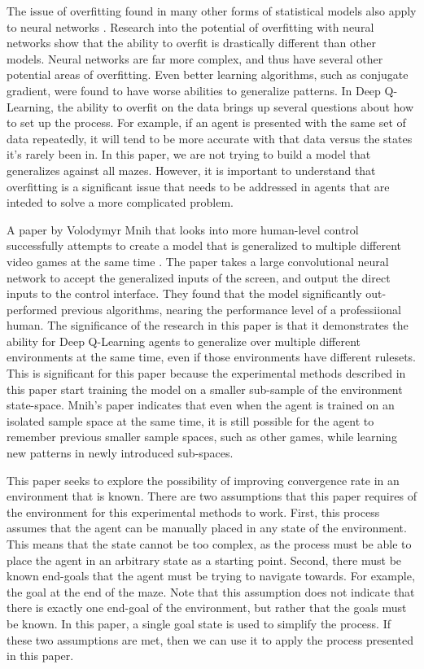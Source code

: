 \documentclass[12pt,letterpaper]{article}
\begin{document}
The issue of overfitting found in many other forms of statistical models also apply to neural networks \cite{article_overfitting_neural_networks}.
Research into the potential of overfitting with neural networks show that the ability to overfit is drastically different than other models.
Neural networks are far more complex, and thus have several other potential areas of overfitting.
Even better learning algorithms, such as conjugate gradient, were found to have worse abilities to generalize patterns.
In Deep Q-Learning, the ability to overfit on the data brings up several questions about how to set up the process.
For example, if an agent is presented with the same set of data repeatedly, it will tend to be more accurate with that data versus the states it's rarely been in.
In this paper, we are not trying to build a model that generalizes against all mazes.
However, it is important to understand that overfitting is a significant issue that needs to be addressed in agents that are inteded to solve a more complicated problem.

A paper by Volodymyr Mnih that looks into more human-level control successfully attempts to create a model that is generalized to multiple different video games at the same time \cite{article_human_level_control_deep_reinforcement_learning}.
The paper takes a large convolutional neural network to accept the generalized inputs of the screen, and output the direct inputs to the control interface.
They found that the model significantly out-performed previous algorithms, nearing the performance level of a professiional human.
The significance of the research in this paper is that it demonstrates the ability for Deep Q-Learning agents to generalize over multiple different environments at the same time, even if those environments have different rulesets.
This is significant for this paper because the experimental methods described in this paper start training the model on a smaller sub-sample of the environment state-space.
Mnih's paper indicates that even when the agent is trained on an isolated sample space at the same time, it is still possible for the agent to remember previous smaller sample spaces, such as other games, while learning new patterns in newly introduced sub-spaces.

This paper seeks to explore the possibility of improving convergence rate in an environment that is known.
There are two assumptions that this paper requires of the environment for this experimental methods to work.
First, this process assumes that the agent can be manually placed in any state of the environment.
This means that the state cannot be too complex, as the process must be able to place the agent in an arbitrary state as a starting point.
Second, there must be known end-goals that the agent must be trying to navigate towards.
For example, the goal at the end of the maze.
Note that this assumption does not indicate that there is exactly one end-goal of the environment, but rather that the goals must be known.
In this paper, a single goal state is used to simplify the process.
If these two assumptions are met, then we can use it to apply the process presented in this paper.
\end{document}
